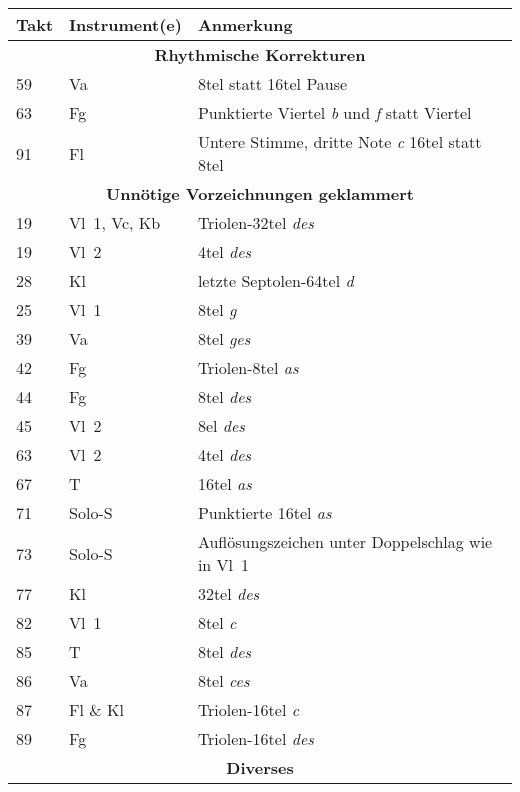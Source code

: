\documentclass[paper=A3,12pt]{scrartcl}
\newcommand{\note}[1]{\textsl{#1}}
\begin{document}
\begin{center}

\begin{tabular}{lll}
\toprule
\textbf{Takt} & \textbf{Instrument(e)} & \textbf{Anmerkung}\\

\midrule
\multicolumn{3}{c}{\textbf{Rhythmische Korrekturen}}\\
\midrule
59 & Va & 8tel statt 16tel Pause\\
63 & Fg & Punktierte Viertel \note{b} und \note{f} statt Viertel\\
91 & Fl & Untere Stimme, dritte Note \note{c} 16tel statt 8tel\\

\midrule
\multicolumn{3}{c}{\textbf{Unnötige Vorzeichnungen geklammert}}\\
\midrule
19 & Vl~1, Vc, Kb & Triolen-32tel \note{des}\\
19 & Vl~2 & 4tel \note{des}\\
28 & Kl & letzte Septolen-64tel \note{d}\\
25 & Vl~1 & 8tel \note{g}\\
39 & Va &  8tel \note{ges}\\
42 & Fg & Triolen-8tel \note{as}\\
44 & Fg & 8tel \note{des}\\
45 & Vl~2 & 8el \note{des}\\
63 & Vl~2 & 4tel \note{des}\\
67 & T & 16tel \note{as}\\
71 & Solo-S & Punktierte 16tel \note{as}\\
73 & Solo-S & Auflösungszeichen unter Doppelschlag wie in Vl~1\\
77 & Kl & 32tel \note{des}\\
82 & Vl~1 & 8tel \note{c}\\
85 & T & 8tel \note{des}\\
86 & Va & 8tel \note{ces}\\
87 & Fl \& Kl & Triolen-16tel \note{c}\\
89 & Fg & Triolen-16tel \note{des}\\

\midrule
\multicolumn{3}{c}{\textbf{Diverses}}\\
\midrule


\end{tabular}
\end{center}
\end{document}
